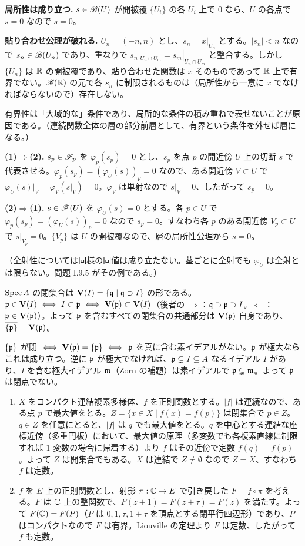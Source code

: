 \textbf{局所性は成り立つ.} $s\in\mathscr{B}(U)$ が開被覆 $\{U_i\}$ の各 $U_i$ 上で $0$ なら、$U$ の各点で $s=0$ なので $s=0$。

\textbf{貼り合わせ公理が破れる.} $U_n=(-n,n)$ とし、$s_n=x|_{U_n}$ とする。$|s_n|<n$ なので $s_n\in\mathscr{B}(U_n)$ であり、重なりで $s_n|_{U_n\cap U_m}=s_m|_{U_n\cap U_m}$ と整合する。しかし $\{U_n\}$ は $\mathbb{R}$ の開被覆であり、貼り合わせた関数は $x$ そのものであって $\mathbb{R}$ 上で有界でない。$\mathscr{B}(\mathbb{R})$ の元で各 $s_n$ に制限されるものは（局所性から一意に $x$ でなければならないので）存在しない。

有界性は「大域的な」条件であり、局所的な条件の積み重ねで表せないことが原因である。（連続関数全体の層の部分前層として、有界という条件を外せば層になる。）

\textbf{(1)$\Rightarrow$(2).} $s_p\in\mathscr{F}_p$ を $\varphi_p(s_p)=0$ とし、$s_p$ を点 $p$ の開近傍 $U$ 上の切断 $s$ で代表させる。$\varphi_p(s_p)=(\varphi_U(s))_p=0$ なので、ある開近傍 $V\subset U$ で $\varphi_U(s)|_V=\varphi_V(s|_V)=0$。$\varphi_V$ は単射なので $s|_V=0$、したがって $s_p=0$。

\textbf{(2)$\Rightarrow$(1).} $s\in\mathscr{F}(U)$ を $\varphi_U(s)=0$ とする。各 $p\in U$ で $\varphi_p(s_p)=(\varphi_U(s))_p=0$ なので $s_p=0$。すなわち各 $p$ のある開近傍 $V_p\subset U$ で $s|_{V_p}=0$。$\{V_p\}$ は $U$ の開被覆なので、層の局所性公理から $s=0$。

（全射性については同様の同値は成り立たない。茎ごとに全射でも $\varphi_U$ は全射とは限らない。問題 I.9.5 がその例である。）

$\operatorname{Spec} A$ の閉集合は $\mathbf{V}(I)=\{\mathfrak{q}\mid\mathfrak{q}\supset I\}$ の形である。$\mathfrak{p}\in\mathbf{V}(I)\iff I\subset\mathfrak{p}\iff\mathbf{V}(\mathfrak{p})\subset\mathbf{V}(I)$（後者の $\Rightarrow$：$\mathfrak{q}\supset\mathfrak{p}\supset I$。$\Leftarrow$：$\mathfrak{p}\in\mathbf{V}(\mathfrak{p})$）。よって $\mathfrak{p}$ を含むすべての閉集合の共通部分は $\mathbf{V}(\mathfrak{p})$ 自身であり、$\overline{\{\mathfrak{p}\}}=\mathbf{V}(\mathfrak{p})$。

$\{\mathfrak{p}\}$ が閉 $\iff\mathbf{V}(\mathfrak{p})=\{\mathfrak{p}\}\iff$ $\mathfrak{p}$ を真に含む素イデアルがない。$\mathfrak{p}$ が極大ならこれは成り立つ。逆に $\mathfrak{p}$ が極大でなければ、$\mathfrak{p}\subsetneq I\subsetneq A$ なるイデアル $I$ があり、$I$ を含む極大イデアル $\mathfrak{m}$（Zorn の補題）は素イデアルで $\mathfrak{p}\subsetneq\mathfrak{m}$。よって $\mathfrak{p}$ は閉点でない。

\begin{enumerate}
  \item $X$ をコンパクト連結複素多様体、$f$ を正則関数とする。$|f|$ は連続なので、ある点 $p$ で最大値をとる。$Z=\{x\in X\mid f(x)=f(p)\}$ は閉集合で $p\in Z$。$q\in Z$ を任意にとると、$|f|$ は $q$ でも最大値をとる。$q$ を中心とする連結な座標近傍（多重円板）において、最大値の原理（多変数でも各複素直線に制限すれば $1$ 変数の場合に帰着する）より $f$ はその近傍で定数 $f(q)=f(p)$。よって $Z$ は開集合でもある。$X$ は連結で $Z\neq\emptyset$ なので $Z=X$、すなわち $f$ は定数。
  \item $f$ を $E$ 上の正則関数とし、射影 $\pi:\mathbb{C}\to E$ で引き戻した $F=f\circ\pi$ を考える。$F$ は $\mathbb{C}$ 上の整関数で、$F(z+1)=F(z+\tau)=F(z)$ を満たす。よって $F(\mathbb{C})=F(P)$（$P$ は $0,1,\tau,1+\tau$ を頂点とする閉平行四辺形）であり、$P$ はコンパクトなので $F$ は有界。Liouville の定理より $F$ は定数、したがって $f$ も定数。
\end{enumerate}

